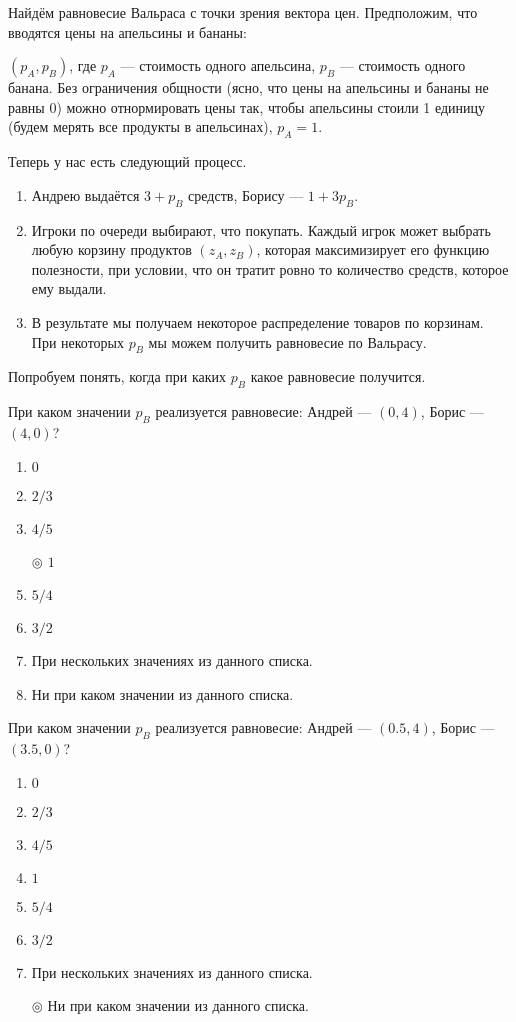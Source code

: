 Найдём равновесие Вальраса с точки зрения вектора цен. Предположим, что вводятся цены на апельсины и бананы:

$(p_A,p_B)$, где $p_A$ --- стоимость одного апельсина, $p_B$ --- стоимость одного банана. Без ограничения общности (ясно, что цены на апельсины и бананы не равны 0) можно отнормировать цены так, чтобы апельсины стоили 1 единицу (будем мерять все продукты в апельсинах), $p_A=1$.

Теперь у нас есть следующий процесс.

\begin{enumerate}
	\item Андрею выдаётся $3+p_B$ средств, Борису --- $1+3p_B$.
	\item Игроки по очереди выбирают, что покупать. Каждый игрок может выбрать любую корзину продуктов $(z_A,z_B)$, которая максимизирует его функцию полезности, при условии, что он тратит ровно то количество средств, которое ему выдали.
	\item В результате мы получаем некоторое распределение товаров по корзинам. При некоторых $p_B$ мы можем получить равновесие по Вальрасу.
\end{enumerate}
Попробуем понять, когда при каких $p_B$ какое равновесие получится.

При каком значении $p_B$ реализуется равновесие: Андрей --- $(0,4)$, Борис --- $(4,0)$?

\begin{enumerate}[label=$\circ$]	%
	\item $0$
	\item $2/3$
	\item $4/5$
	\item[$\circledcirc$] $1$
	\item $5/4$
	\item $3/2$
	\item При нескольких значениях из данного списка.
	\item Ни при каком значении из данного списка.
\end{enumerate}

\task
При каком значении $p_B$ реализуется равновесие: Андрей --- $(0.5,4)$, Борис --- $(3.5,0)$?

\begin{enumerate}[label=$\circ$] %
	\item $0$
	\item $2/3$
	\item $4/5$
	\item $1$
	\item $5/4$
	\item $3/2$
	\item При нескольких значениях из данного списка.
	\item[$\circledcirc$] Ни при каком значении из данного списка.
\end{enumerate}